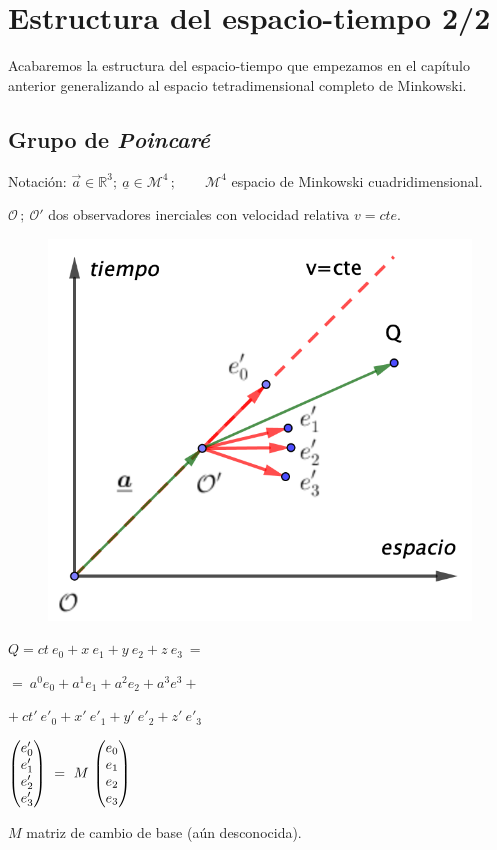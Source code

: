 \chapter{Estructura del espacio-tiempo 2/2}



\vspace{10mm}
\begin{adjustwidth}{50pt}{50pt}
\begin{ejemplo}
Acabaremos la estructura del espacio-tiempo que empezamos en el capítulo anterior generalizando al espacio tetradimensional completo de Minkowski.
\end{ejemplo}
\end{adjustwidth}
\vspace{5mm}

\section{Grupo de \emph{Poincaré}}

Notación: $\vec a \in \mathbb R^3;\ \underline a \in \mathcal M^4\, ; \qquad \mathcal M^4$ espacio de Minkowski cuadridimensional.

$\mathcal O\,;\ \mathcal O'$ dos observadores inerciales con velocidad relativa $v=cte$.

\begin{multicols}{2}
\begin{figure}[H]
	\centering
	\includegraphics[width=.45\textwidth]{imagenes/img31-01.png}
\end{figure}


$Q=ct\ e_0+x\ e_1+y\ e_2+ z\ e_3 \ = $  

$=\ a^0e_0+a^1e_1+a^2e_2+a^3e^3+ \ $

$+\ ct'\ e'_0+x'\ e'_1+y'\ e'_2+ z'\ e'_3$

$\mqty(e'_0\\e'_1\\e'_2\\e'_3) \ = \ M \ \mqty(e_0\\e_1\\e_2\\e_3)$

$M$ matriz de cambio de base (aún desconocida).

\end{multicols}

